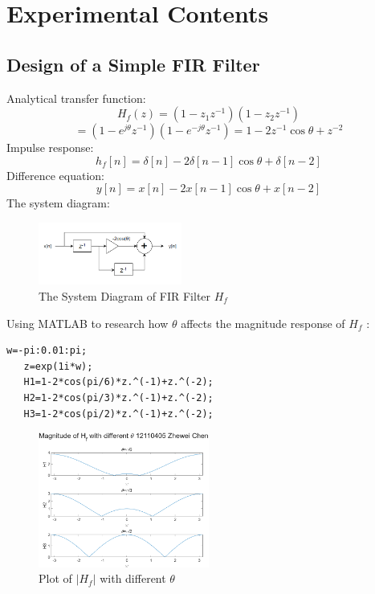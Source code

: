 \documentclass[journal]{IEEEtran}
\begin{document}
\section{Experimental Contents}
\label{sec:guidelines}


\subsection{Design of a Simple FIR Filter}



Analytical transfer function:
\[
H_{f}(z) = (1 - z_{1}z^{-1})(1 - z_{2}z^{-1})
\]
\[
= (1 - e^{j\theta}z^{-1})(1 - e^{-j\theta}z^{-1})
= 1 - 2z^{-1}\cos \theta + z^{-2}
\]
Impulse response:
\[h_{f}[n] = \delta[n] - 2 \delta[n-1] \cos \theta + \delta[n-2]\]
Difference equation:
\[y[n] = x[n] - 2 x[n-1] \cos \theta + x[n-2]\]
The system diagram:
\begin{figure}[htbp]
   \centering
   \includegraphics[width=0.42\textwidth]{2.png} 
\caption{The System Diagram of FIR Filter \(H_f\) }
 \end{figure}

 Using MATLAB to research how \(\theta\) affects the magnitude response of \(H_f\) :
 \begin{lstlisting}[style=Matlab-editor]
   w=-pi:0.01:pi;
   z=exp(1i*w);
   H1=1-2*cos(pi/6)*z.^(-1)+z.^(-2);
   H2=1-2*cos(pi/3)*z.^(-1)+z.^(-2);
   H3=1-2*cos(pi/2)*z.^(-1)+z.^(-2);
\end{lstlisting}

\begin{figure}[htbp]
   \centering
   \includegraphics[width=0.5\textwidth]{31.png} 
\caption{Plot of \(\lvert H_{f}\rvert\) with different \(\theta\)}
 \end{figure}
\end{document}
